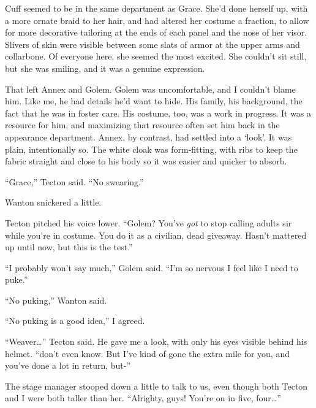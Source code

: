 Cuff seemed to be in the same department as Grace.  She'd done herself up, with a more ornate braid to her hair, and had altered her costume a fraction, to allow for more decorative tailoring at the ends of each panel and the nose of her visor.  Slivers of skin were visible between some slats of armor at the upper arms and collarbone.  Of everyone here, she seemed the most excited.  She couldn't sit still, but she was smiling, and it was a genuine expression.



That left Annex and Golem.  Golem was uncomfortable, and I couldn't blame him.  Like me, he had details he'd want to hide.  His family, his background, the fact that he was in foster care.  His costume, too, was a work in progress.  It was a resource for him, and maximizing that resource often set him back in the appearance department.  Annex, by contrast, had settled into a `look'.  It was plain, intentionally so.  The white cloak was form-fitting, with ribs to keep the fabric straight and close to his body so it was easier and quicker to absorb.



``Grace,'' Tecton said.  ``No swearing.''



Wanton snickered a little.



Tecton pitched his voice lower.  ``Golem?  You've \emph{got} to stop calling adults sir while you're in costume.  You do it as a civilian, dead giveaway.  Hasn't mattered up until now, but this is the test.''



``I probably won't say much,'' Golem said.  ``I'm so nervous I feel like I need to puke.''



``No puking,'' Wanton said.



``No puking is a good idea,'' I agreed.



``Weaver\ldots'' Tecton said.  He gave me a look, with only his eyes visible behind his helmet.  ``\ldotsI don't even know.  But I've kind of gone the extra mile for you, and you've done a lot in return, but-''



The stage manager stooped down a little to talk to us, even though both Tecton and I were both taller than her.  ``Alrighty, guys!  You're on in five, four\ldots''



